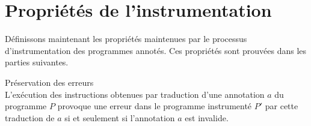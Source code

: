 







\section{Propriétés de l'instrumentation}
\label{sec:properties}


Définissons maintenant les propriétés maintenues par le processus
d'instrumentation des programmes annotés.
Ces propriétés sont prouvées dans les parties suivantes.


\begin{property}{Préservation des erreurs}\label{th:error}~\\
  L'exécution des instructions obtenues par traduction d'une annotation $a$ du
  programme $P$ provoque une erreur dans le programme instrumenté $P'$ par cette
  traduction de $a$ si et seulement si l'annotation $a$ est invalide.
\end{property}

